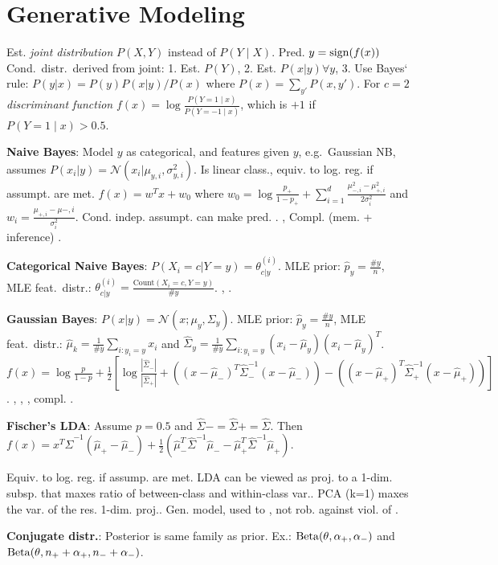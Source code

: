 \section{Generative Modeling}

Est. \emph{joint distribution} $P(X,Y)$ instead of $P(Y \mid X)$. Pred. $y = \operatorname*{sign}(f(x))$ Cond.\
distr.\ derived from joint:  1. Est. $P(Y)$, 2. Est. $P(x|y) \forall y$, 3. Use Bayes‘ rule: $P(y|x) = P(y) P(x|y)/P(x)$ where $P(x) = \sum_{y'} P(x, y')$.  For $c=2$ \emph{discriminant function} $f(x)
= \log\frac{P(Y = 1 \mid x)}{P(Y = -1 \mid x)}$, which is $+1$ if $P(Y = 1 \mid x) > 0.5$.

\textbf{Naive Bayes}: Model $y$ as categorical, and features \red{conditionally
independent} given $y$, e.g.\ Gaussian NB, assumes $P(x_i | y) =
\mathcal{N}(x_i | \mu_{y,i}, \sigma^2_{y,i})$. Is linear class., equiv. to log. reg. if assumpt. are met. $f(x) = w^T x + w_0$
where $w_0 = \log\frac{p_+}{1 - p_+} + \sum_{i=1}^d \frac{\mu_{-,i}^2 -
\mu_{+,i}^2}{2 \sigma_i^2}$ and $w_i = \frac{\mu_{+,i} - \mu{-,i}}{\sigma_i^2}$. Cond. indep. assumpt. can make pred. . , Compl. (mem. + inference) .

\textbf{Categorical Naive Bayes}: $P(X_i =c|Y =y)=\theta^{(i)}_{c|y}$. MLE prior: $\hat{p}_y = \frac{\# y}{n}$, MLE feat.\ distr.: $\theta^{(i)}_{c|y} = \frac{\text{Count}(X_i = c, Y = y)}{\# y}$. , .

\textbf{Gaussian Bayes}: $P(x|y) = \mathcal{N}(x; \mu_y, \Sigma_y)$. MLE prior: $\hat{p}_y = \frac{\# y}{n}$, MLE feat.\ distr.: $\hat{\mu}_k = \frac{1}{\# y} \sum_{i: y_i = y} x_i$ and $\hat{\Sigma}_y = \frac{1}{\# y}
\sum_{i: y_i = y} (x_i - \hat{\mu}_y) (x_i - \hat{\mu}_y)^T$. $f(x) = \log\frac{p}{1-p} + \frac{1}{2} [\log\frac{|\hat{\Sigma}_-|}{|\hat{\Sigma}_+|} + ( (x - \hat{\mu}_-)^T \hat{\Sigma}_-^{-1} (x-\hat{\mu}_-) ) - ( (x - \hat{\mu}_+)^T \hat{\Sigma}_+^{-1} (x-\hat{\mu}_+) ) ]$. , , , compl. .

\textbf{Fischer's LDA}: Assume $p = 0.5$ and $\hat{\Sigma}- = \hat{\Sigma}+ = \hat{\Sigma}$. Then $f(x) =
x^T \hat{\Sigma}^{-1} (\hat{\mu}_+ - \hat{\mu}_-)+ \frac{1}{2} \left( \hat{\mu}_-^T \hat{\Sigma}^{-1} \hat{\mu}_- -
\hat{\mu}_+^T \hat{\Sigma}^{-1} \hat{\mu}_+\right)$.

Equiv. to log. reg. if assump. are met. LDA can be viewed as proj. to a 1-dim. subsp. that maxes ratio of between-class and within-class var.. PCA (k=1) maxes the var. of the res. 1-dim. proj.. Gen. model, used to , not rob. against viol. of .

\textbf{Conjugate distr.}: Posterior is same family as prior. Ex.: $\operatorname*{Beta}(\theta,
\alpha_+, \alpha_-)$ and $\operatorname*{Beta}(\theta, n_+ + \alpha_+, n_- + \alpha_-)$.
